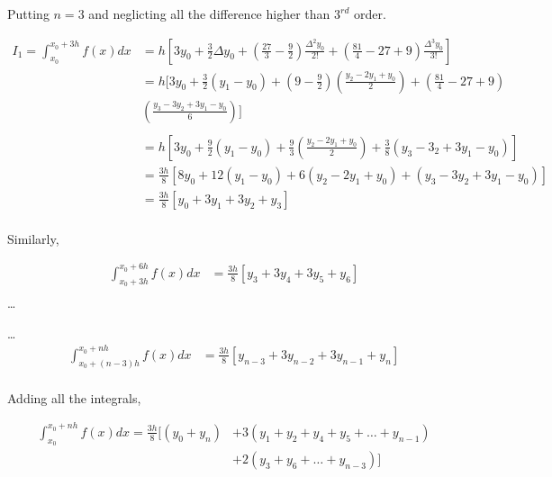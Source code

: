 \documentclass{article}
\begin{document}
              Putting $n=3$ and neglicting all the difference higher than $3^{rd}$ order.

              \begin{align*}
                I_1=\int_{x_0}^{x_0+3h}f(x)dx &= h[3y_0+\frac{3}{2}\Delta y_0+(\frac{27}{3}-\frac{9}{2})\frac{\Delta^2y_0}{2!}+(\frac{81}{4}-27+9)\frac{\Delta^3y_0}{3!}]\\
                                        &= h[3y_0+\frac{3}{2}(y_1-y_0)+(9-\frac{9}{2})(\frac{y_2-2y_1+y_0}{2})+(\frac{81}{4}-27+9)\\
                                        &  (\frac{y_3-3y_2+3y_1-y_0}{6})]\\
                                        \ \\ 
                                        &= h[3y_0+\frac{9}{2}(y_1-y_0)+\frac{9}{3}(\frac{y_2-2y_1+y_0}{2})+\frac{3}{8}(y_3-3_2+3y_1-y_0)]\\
                                        &= \frac{3h}{8}[8y_0+12(y_1-y_0)+6(y_2-2y_1+y_0)+(y_3-3y_2+3y_1-y_0)]\\
                                        &= \frac{3h}{8}[y_0+3y_1+3y_2+y_3]\\
              \end{align*}
              
              Similarly,
              
              \begin{align*}
                \int_{x_0+3h}^{x_0+6h}f(x)dx &= \frac{3h}{8}[y_3+3y_4+3y_5+y_6]\\
              \end{align*}
              \dots
              
              \dots
              \begin{align*}
                \int_{x_0+(n-3)h}^{x_0+nh}f(x)dx &= \frac{3h}{8}[y_{n-3}+3y_{n-2}+3y_{n-1}+y_n]\\
              \end{align*}
              
              Adding all the integrals,
              
              \begin{align*}
                \int_{x_0}^{x_0+nh}f(x)dx=\frac{3h}{8}[(y_0+y_n) &+ 3(y_1+y_2+y_4+y_5+\dots+y_{n-1})\\
                                                                 &+ 2(y_3+y_6+\dots+y_{n-3})]
              \end{align*}
\end{document}
